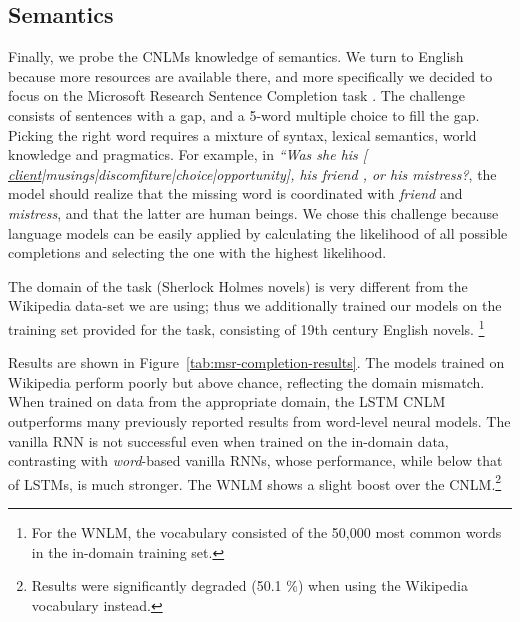 

\subsection{Semantics}
\label{sec:semantics}

Finally, we probe the CNLMs knowledge of semantics. We turn to English
because more resources are available there, and more specifically we
decided to focus on the Microsoft Research Sentence Completion task
\cite{Zweig:Burges:2011}. The challenge consists of sentences with a
gap, and a 5-word multiple choice to fill the gap. Picking the right
word requires a mixture of syntax, lexical semantics, world knowledge
and pragmatics. For example, in \emph{``Was she his [
  \underline{client}|musings|discomfiture|choice|opportunity], his
  friend , or his mistress?}, the model should realize that the
missing word is coordinated with \emph{friend} and \emph{mistress},
and that the latter are human beings. We chose this challenge because
language models can be easily applied by calculating the likelihood of
all possible completions and selecting the one with the highest
likelihood.

The domain of the task (Sherlock Holmes novels) is very different from
the Wikipedia data-set we are using; thus we additionally trained our
models on the training set provided for the task, consisting of 19th
century English novels. 
\footnote{For the WNLM, the vocabulary consisted
of the 50,000 most common words in the in-domain training set.}

Results are shown in Figure~\ref{tab:msr-completion-results}.  The
models trained on Wikipedia perform poorly but above chance,
reflecting the domain mismatch.  When trained on data from the
appropriate domain, the LSTM CNLM outperforms many previously reported
results from word-level neural
models. %
The vanilla RNN is not successful even when trained on the in-domain
data, contrasting with \emph{word}-based vanilla RNNs, whose
performance, while below that of LSTMs, is much stronger.
The WNLM shows a slight boost over the CNLM.\footnote{Results were significantly degraded (50.1 \%) when using the Wikipedia vocabulary instead.}

